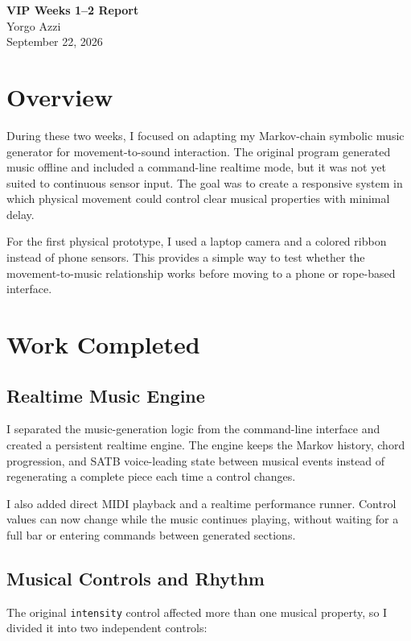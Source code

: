\documentclass[11pt,a4paper]{article}
\begin{document}
\begin{center}
    {\Large\bfseries VIP Weeks 1--2 Report}\\[0.5em]
    {\large Yorgo Azzi}\\[0.25em]
    September 22, 2026
\end{center}

\section{Overview}

During these two weeks, I focused on adapting my Markov-chain symbolic music
generator for movement-to-sound interaction. The original program generated
music offline and included a command-line realtime mode, but it was not yet
suited to continuous sensor input. The goal was to create a responsive system
in which physical movement could control clear musical properties with minimal
delay.

For the first physical prototype, I used a laptop camera and a colored ribbon
instead of phone sensors. This provides a simple way to test whether the
movement-to-music relationship works before moving to a phone or rope-based
interface.

\section{Work Completed}

\subsection{Realtime Music Engine}

I separated the music-generation logic from the command-line interface and
created a persistent realtime engine. The engine keeps the Markov history,
chord progression, and SATB voice-leading state between musical events instead
of regenerating a complete piece each time a control changes.

I also added direct MIDI playback and a realtime performance runner. Control
values can now change while the music continues playing, without waiting for a
full bar or entering commands between generated sections.

\subsection{Musical Controls and Rhythm}

The original \texttt{intensity} control affected more than one musical
property, so I divided it into two independent controls:
\end{document}
